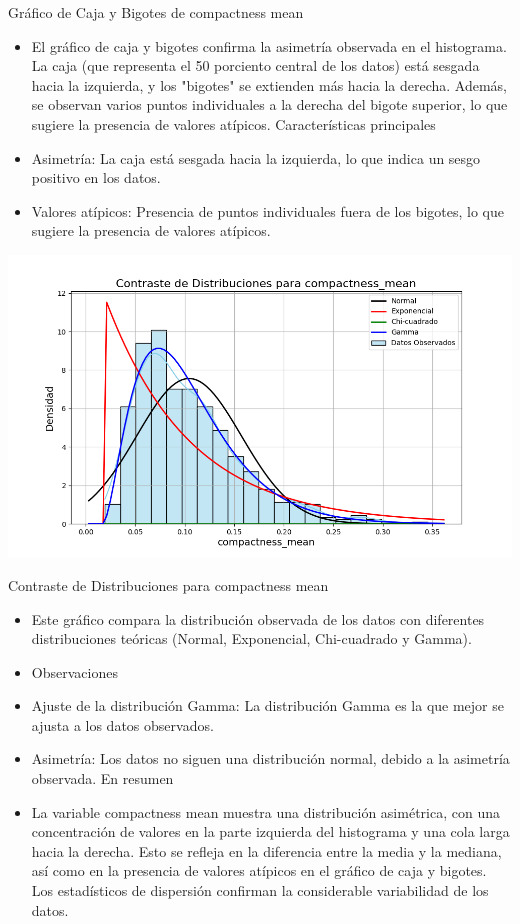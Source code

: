 \documentclass[a4paper, 12pt]{article}
\begin{document}
Gráfico de Caja y Bigotes de compactness mean
\begin{itemize}
\item El gráfico de caja y bigotes confirma la asimetría observada en el histograma. La caja (que representa el 50 porciento central de los datos) está sesgada hacia la izquierda, y los "bigotes" se extienden más hacia la derecha. Además, se observan varios puntos individuales a la derecha del bigote superior, lo que sugiere la presencia de valores atípicos.
Características principales

\item Asimetría: La caja está sesgada hacia la izquierda, lo que indica un sesgo positivo en los datos.
\item Valores atípicos: Presencia de puntos individuales fuera de los bigotes, lo que sugiere la presencia de valores atípicos.
\end{itemize}

\includegraphics[width=\textwidth]{../Plots/plots_stats/compactness_mean/distribuciones_conocidas_compactness_mean.png}

Contraste de Distribuciones para compactness mean
\begin{itemize}
\item Este gráfico compara la distribución observada de los datos con diferentes distribuciones teóricas (Normal, Exponencial, Chi-cuadrado y Gamma).

\item Observaciones

\item Ajuste de la distribución Gamma: La distribución Gamma es la que mejor se ajusta a los datos observados.
\item Asimetría: Los datos no siguen una distribución normal, debido a la asimetría observada.
En resumen
\item La variable compactness mean muestra una distribución asimétrica, con una concentración de valores en la parte izquierda del histograma y una cola larga hacia la derecha. Esto se refleja en la diferencia entre la media y la mediana, así como en la presencia de valores atípicos en el gráfico de caja y bigotes. Los estadísticos de dispersión confirman la considerable variabilidad de los datos.
\end{itemize}
\end{document}
